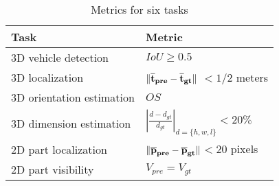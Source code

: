 
\renewcommand{\arraystretch}{1.5}
\begin{table}[ht]
	\centering
	\caption{Metrics for six tasks}
	\label{my-label}
	\begin{tabular}{|m{6cm}|m{6cm}|}
		\hline
		Task                    & Metric         \\ \hline
		3D vehicle detection    & $IoU \geq 0.5$ \\  \hline
		3D localization         &$\bf \lVert \overline t_{pre} - \overline t_{gt} \rVert$ $< 1 / 2$ meters   \\ \hline
		3D orientation estimation  & $OS$     \\ \hline
		3D dimension estimation & $\left | \frac{d-d_{gt}}{d_{gt}} \right | _{d =\{h,w,l\}}<  20\%$           \\ \hline
		2D part localization    & $ \bf \lVert \overline p_{pre} - \overline p_{gt} \rVert $$<  20$ pixels      \\ \hline
		2D part visibility      &     $V_{pre} = V_{gt}$         \\ \hline
	\end{tabular}
\end{table}
